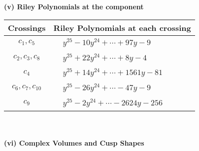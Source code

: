 \documentclass[1p]{elsarticle_modified}
\theoremstyle{definition}
\begin{document}
\newpage\renewcommand{\arraystretch}{1}
\flushleft \textbf{(v) Riley Polynomials at the component}\newline \\
\begin{tabular}{m{50pt}|m{274pt}}
Crossings & \hspace{64pt}Riley Polynomials at each crossing \\
\hline $$\begin{aligned}c_{1},c_{5}\end{aligned}$$&$\begin{aligned}
&y^{25}-10 y^{24}+\cdots+97 y-9
\end{aligned}$\\
\hline $$\begin{aligned}c_{2},c_{3},c_{8}\end{aligned}$$&$\begin{aligned}
&y^{25}+22 y^{24}+\cdots+8 y-4
\end{aligned}$\\
\hline $$\begin{aligned}c_{4}\end{aligned}$$&$\begin{aligned}
&y^{25}+14 y^{24}+\cdots+1561 y-81
\end{aligned}$\\
\hline $$\begin{aligned}c_{6},c_{7},c_{10}\end{aligned}$$&$\begin{aligned}
&y^{25}-26 y^{24}+\cdots-47 y-9
\end{aligned}$\\
\hline $$\begin{aligned}c_{9}\end{aligned}$$&$\begin{aligned}
&y^{25}-2 y^{24}+\cdots-2624 y-256
\end{aligned}$\\
\hline
\end{tabular}\\~\\
\newpage\flushleft \textbf{(vi) Complex Volumes and Cusp Shapes}
\end{document}
